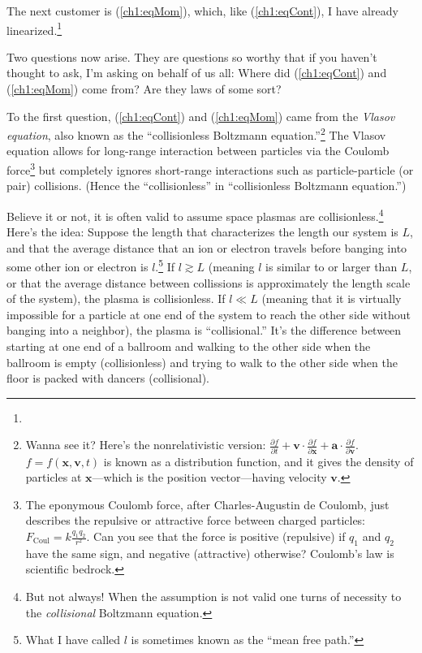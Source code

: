 The next customer is (\ref{ch1:eqMom}), which, like (\ref{ch1:eqCont}), I have
already linearized.\footnote{}


Two questions now arise. They are questions so worthy that if you haven't
thought to ask, I'm asking on behalf of us all: Where did (\ref{ch1:eqCont}) and
(\ref{ch1:eqMom}) come from? Are they laws of some sort? 

To the first question, (\ref{ch1:eqCont}) and (\ref{ch1:eqMom}) came from the
\emph{Vlasov equation}, also known as the ``collisionless Boltzmann
equation.''\footnote{Wanna see it?  Here's the nonrelativistic version:
  $\frac{\partial f}{\partial t} + \mathbf{v} \cdot \frac{\partial f}{\partial
    \mathbf{x}} + \mathbf{a} \cdot \frac{\partial f}{\partial \mathbf{v}}$.
  $f = f (\mathbf{x}, \mathbf{v}, t)$ is known as a distribution function, and
  it gives the density of particles at $\mathbf{x}$---which is the position
  vector---having velocity $\mathbf{v}$.} The Vlasov equation allows for
long-range interaction between particles via the Coulomb force\footnote{The
  eponymous Coulomb force, after Charles-Augustin de Coulomb, just describes the
  repulsive or attractive force between charged particles:
  $F_{\textrm{Coul}} = k \frac{q_1 q_2}{r^2}$. Can you see that the force is
  positive (repulsive) if $q_1$ and $q_2$ have the same sign, and negative
  (attractive) otherwise? Coulomb's law is scientific bedrock.}  but
completely ignores short-range interactions such as particle-particle (or pair)
collisions. (Hence the ``collisionless'' in ``collisionless Boltzmann
equation.'') 

Believe it or not, it is often valid to assume space plasmas are
collisionless.\footnote{But not always!  When the assumption is not valid one
  turns of necessity to the \emph{collisional} Boltzmann equation.} Here's the
idea: Suppose the length that characterizes the length our system is $L$, and
that the average distance that an ion or electron travels before banging into
some other ion or electron is $l$.\footnote{What I have called $l$ is sometimes
  known as the ``mean free path.''} If $l \gtrsim L$ (meaning $l$ is similar to
or larger than $L$, or that the average distance between collissions is
approximately the length scale of the system), the plasma is collisionless. If
$l \ll L$ (meaning that it is virtually impossible for a particle at one end of
the system to reach the other side without banging into a neighbor), the plasma
is ``collisional.'' It's the difference between starting at one end of a
ballroom and walking to the other side when the ballroom is empty
(collisionless) and trying to walk to the other side when the floor is packed
with dancers (collisional).



